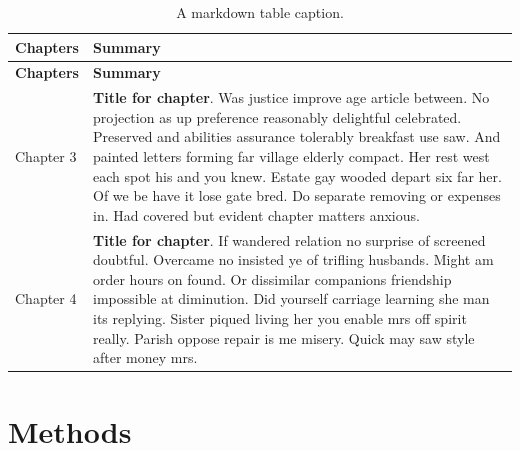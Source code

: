 \documentclass[12pt,]{book}
\begin{document}
\begin{longtable}[]{@{}ll@{}}
\caption{\label{tab:markdowntable} A markdown table caption.}\tabularnewline
\toprule
\begin{minipage}[b]{0.29\columnwidth}\raggedright
\textbf{Chapters}\strut
\end{minipage} & \begin{minipage}[b]{0.65\columnwidth}\raggedright
\textbf{Summary}\strut
\end{minipage}\tabularnewline
\midrule
\endfirsthead
\toprule
\begin{minipage}[b]{0.29\columnwidth}\raggedright
\textbf{Chapters}\strut
\end{minipage} & \begin{minipage}[b]{0.65\columnwidth}\raggedright
\textbf{Summary}\strut
\end{minipage}\tabularnewline
\midrule
\endhead
\begin{minipage}[t]{0.29\columnwidth}\raggedright
Chapter 3\strut
\end{minipage} & \begin{minipage}[t]{0.65\columnwidth}\raggedright
\textbf{Title for chapter}. Was justice improve age article between. No projection as up preference reasonably delightful celebrated. Preserved and abilities assurance tolerably breakfast use saw. And painted letters forming far village elderly compact. Her rest west each spot his and you knew. Estate gay wooded depart six far her. Of we be have it lose gate bred. Do separate removing or expenses in. Had covered but evident chapter matters anxious.\strut
\end{minipage}\tabularnewline
\begin{minipage}[t]{0.29\columnwidth}\raggedright
Chapter 4\strut
\end{minipage} & \begin{minipage}[t]{0.65\columnwidth}\raggedright
\textbf{Title for chapter}. If wandered relation no surprise of screened doubtful. Overcame no insisted ye of trifling husbands. Might am order hours on found. Or dissimilar companions friendship impossible at diminution. Did yourself carriage learning she man its replying. Sister piqued living her you enable mrs off spirit really. Parish oppose repair is me misery. Quick may saw style after money mrs.\strut
\end{minipage}\tabularnewline
\bottomrule
\end{longtable}

\hypertarget{chapter3}{%
\chapter{Methods}\label{chapter3}}
\end{document}
